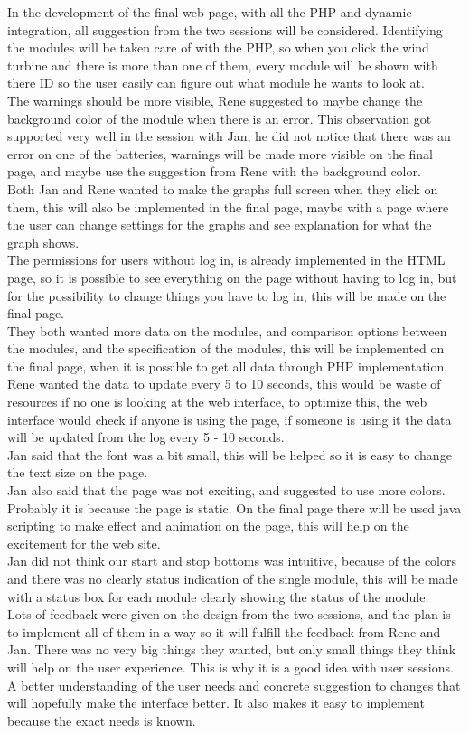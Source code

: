 In the development of the final web page, with all the PHP and dynamic integration, all suggestion from the two sessions will be considered. Identifying the modules will be taken care of with the PHP, so when you click the wind turbine and there is more than one of them, every module will be shown with there ID so the user easily can figure out what module he wants to look at.\\
The warnings should be more visible, Rene suggested to maybe change the background color of the module when there is an error. This observation got supported very well in the session with Jan, he did not notice that there was an error on one of the batteries, warnings will be made more visible on the final page, and maybe use the suggestion from Rene with the background color.\\
Both Jan and Rene wanted to make the graphs full screen when they click on them, this will also be implemented in the final page, maybe with a page where the user can change settings for the graphs and see explanation for what the graph shows.\\
The permissions for users without log in, is already implemented in the HTML page, so it is possible to see everything on the page without having to log in, but for the possibility to change things you have to log in, this will be made on the final page.\\
They both wanted more data on the modules, and comparison options between the modules, and the specification of the modules, this will be implemented on the final page, when it is possible to get all data through PHP implementation.\\
Rene wanted the data to update every 5 to 10 seconds, this would be waste of resources if no one is looking at the web interface, to optimize this, the web interface would check if anyone is using the page, if someone is using it the data will be updated from the log every 5 - 10 seconds.\\
Jan said that the font was a bit small, this will be helped so it is easy to change the text size on the page.\\
Jan also said that the page was not exciting, and suggested to use more colors. Probably it is because the page is static. On the final page there will be used java scripting to make effect and animation on the page, this will help on the excitement for the web site.\\
Jan did not think our start and stop bottoms was intuitive, because of the colors and there was no clearly status indication of the single module, this will be made with a status box for each module clearly showing the status of the module.\\
Lots of feedback were given on the design from the two sessions, and the plan is to implement all of them in a way so it will fulfill the feedback from Rene and Jan. There was no very big things they wanted, but only small things they think will help on the user experience. This is why it is a good idea with user sessions. A better understanding of the user needs and concrete suggestion to changes that will hopefully make the interface better. It also makes it easy to implement because the exact needs is known.

